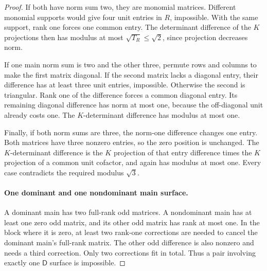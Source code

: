 \begin{proof}
If both have norm sum two, they are monomial matrices. Different
monomial supports would give four unit entries in $R$, impossible.
With the same support, rank one forces one common entry. The determinant
difference of the $K$ projections then has modulus at most
$\sqrt{T_R}\leq\sqrt2$, since projection decreases norm.

If one main norm sum is two and the other three, permute rows and
columns to make the first matrix diagonal. If the second matrix lacks
a diagonal entry, their difference has at least three unit entries,
impossible. Otherwise the second is triangular. Rank one of the
difference forces a common diagonal entry. Its remaining diagonal
difference has norm at most one, because the off-diagonal unit already
costs one. The $K$-determinant difference has modulus at most one.

Finally, if both norm sums are three, the norm-one difference changes
one entry. Both matrices have three nonzero entries, so the zero
position is unchanged. The $K$-determinant difference is the $K$
projection of that entry difference times the $K$ projection of a
common unit cofactor, and again has modulus at most one. Every case
contradicts the required modulus $\sqrt3$.

\paragraph{One dominant and one nondominant main surface.}
A dominant main has two full-rank odd matrices. A nondominant main
has at least one zero odd matrix, and its other odd matrix has rank
at most one. In the block where it is zero, at least two rank-one
corrections are needed to cancel the dominant main's full-rank matrix.
The other odd difference is also nonzero and needs a third correction.
Only two corrections fit in total. Thus a pair involving exactly one
$\mathsf D$ surface is impossible.


\end{proof}
